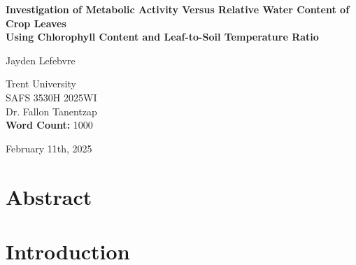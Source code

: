 \documentclass{report}
\begin{document}
\begin{titlepage}
    \begin{center}
        \vspace*{1.2cm}

        \textbf{Investigation of Metabolic Activity Versus Relative Water Content of Crop Leaves\\Using Chlorophyll Content and Leaf-to-Soil Temperature Ratio}

        \vspace{2cm}

        Jayden Lefebvre\\

        \vspace{5cm}
        
        Trent University\\
        SAFS 3530H 2025WI\\
        Dr. Fallon Tanentzap\\
        \textbf{Word Count:} 1000

        \vfill

        February 11th, 2025
        
    \end{center}
\end{titlepage}

\clearpage

\thispagestyle{plain}
\tableofcontents

\vfill


\section*{Abstract}




\clearpage


\section{Introduction}
\end{document}
